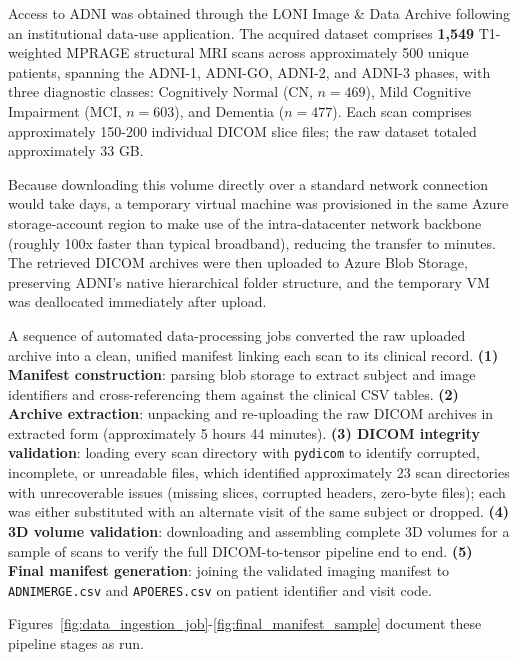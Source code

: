 \documentclass[pdflatex,sn-mathphys-num]{sn-jnl}%
\theoremstyle{thmstyleone}%
\theoremstyle{thmstyletwo}%
\theoremstyle{thmstylethree}%
\begin{document}
Access to ADNI was obtained through the LONI Image \& Data Archive following an institutional data-use application. The acquired dataset comprises \textbf{1,549} T1-weighted MPRAGE structural MRI scans across approximately 500 unique patients, spanning the ADNI-1, ADNI-GO, ADNI-2, and ADNI-3 phases, with three diagnostic classes: Cognitively Normal (CN, $n=469$), Mild Cognitive Impairment (MCI, $n=603$), and Dementia ($n=477$). Each scan comprises approximately 150-200 individual DICOM slice files; the raw dataset totaled approximately 33 GB.

Because downloading this volume directly over a standard network connection would take days, a temporary virtual machine was provisioned in the same Azure storage-account region to make use of the intra-datacenter network backbone (roughly 100x faster than typical broadband), reducing the transfer to minutes. The retrieved DICOM archives were then uploaded to Azure Blob Storage, preserving ADNI's native hierarchical folder structure, and the temporary VM was deallocated immediately after upload.

A sequence of automated data-processing jobs converted the raw uploaded archive into a clean, unified manifest linking each scan to its clinical record. \textbf{(1) Manifest construction}: parsing blob storage to extract subject and image identifiers and cross-referencing them against the clinical CSV tables. \textbf{(2) Archive extraction}: unpacking and re-uploading the raw DICOM archives in extracted form (approximately 5 hours 44 minutes). \textbf{(3) DICOM integrity validation}: loading every scan directory with \texttt{pydicom} to identify corrupted, incomplete, or unreadable files, which identified approximately 23 scan directories with unrecoverable issues (missing slices, corrupted headers, zero-byte files); each was either substituted with an alternate visit of the same subject or dropped. \textbf{(4) 3D volume validation}: downloading and assembling complete 3D volumes for a sample of scans to verify the full DICOM-to-tensor pipeline end to end. \textbf{(5) Final manifest generation}: joining the validated imaging manifest to \texttt{ADNIMERGE.csv} and \texttt{APOERES.csv} on patient identifier and visit code.

Figures~\ref{fig:data_ingestion_job}-\ref{fig:final_manifest_sample} document these pipeline stages as run.
\end{document}
